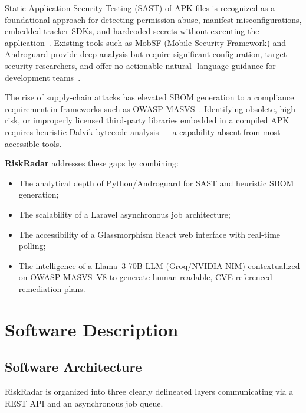 \documentclass[3p,times]{elsarticle}
\begin{document}
Static Application Security Testing (SAST) of APK files is recognized as a
foundational approach for detecting permission abuse, manifest misconfigurations,
embedded tracker SDKs, and hardcoded secrets without executing the
application~\cite{ref3}. Existing tools such as MobSF (Mobile Security
Framework) and Androguard provide deep analysis but require significant
configuration, target security researchers, and offer no actionable natural-
language guidance for development teams~\cite{ref4}.

The rise of supply-chain attacks has elevated SBOM generation to a compliance
requirement in frameworks such as OWASP MASVS~\cite{ref5}. Identifying obsolete,
high-risk, or improperly licensed third-party libraries embedded in a compiled
APK requires heuristic Dalvik bytecode analysis — a capability absent from most
accessible tools.

\textbf{RiskRadar} addresses these gaps by combining:
\begin{itemize}
  \item The analytical depth of Python/Androguard for SAST and heuristic SBOM generation;
  \item The scalability of a Laravel asynchronous job architecture;
  \item The accessibility of a Glassmorphism React web interface with real-time polling;
  \item The intelligence of a Llama~3 70B LLM (Groq/NVIDIA NIM) contextualized on
  OWASP MASVS~V8 to generate human-readable, CVE-referenced remediation plans.
\end{itemize}

\section{Software Description}

\subsection{Software Architecture}

RiskRadar is organized into three clearly delineated layers
communicating via a REST API and an asynchronous job queue.
\end{document}
